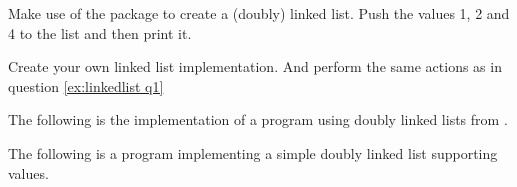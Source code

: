 \begin{Exercise}[title={Linked List},difficulty=1]
\label{ex:linkedlist}
\Question
\label{ex:linkedlist q1}
Make use of the package  to create
a (doubly) linked list. Push the values 1, 2 and 4 to the list and then
print it.

\Question
Create your own linked list implementation. And perform the same actions
as in question \ref{ex:linkedlist q1}
\end{Exercise}

\begin{Answer}
\Question The following is the implementation of a program using doubly
linked lists from .


\Question The following is a program implementing a simple doubly
linked list supporting  values.

\showremarks
\end{Answer}
